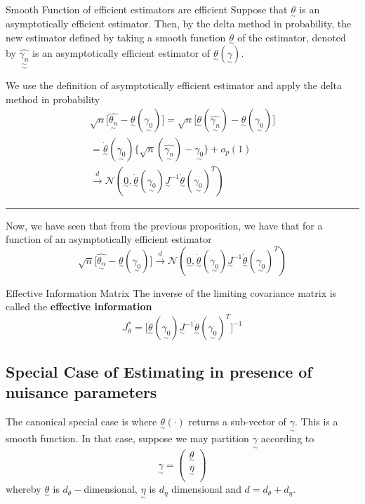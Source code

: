 \documentclass[twoside]{article}
\newenvironment{proof}{{\bf Proof:}}{\hfill\rule{2mm}{2mm}}
\newcommand{\utilde}{\underset{\sim}}
\begin{document}
\begin{proposition_exam}{Smooth Function of efficient estimators are efficient}{}
Suppose that $\utilde{\theta}$ is an asymptotically efficient estimator. Then, by the delta method in probability, the new estimator defined by taking a smooth function $\utilde{\theta}$ of the estimator, denoted by $\utilde{\utilde{\hat{\gamma_{n}}}}$ is an asymptotically efficient estimator of $\utilde{\theta}(\utilde{\gamma})$.
\end{proposition_exam}
\begin{proof} We use the definition of asymptotically efficient estimator and apply the delta method in probability
\begin{align}
\sqrt{n}\big[\hat{\utilde{\theta_{n}}} - \utilde{\theta}(\utilde{\gamma_{0}}) \big] = \sqrt{n}\big[\utilde{\theta}(\hat{\utilde{\gamma_{n}}}) - \utilde{\theta}(\utilde{\gamma_{0}}) \big] \\= \dot{\utilde{\theta}}(\utilde{\gamma_{0}})\bigg\{\sqrt{n}(\hat{\utilde{\gamma_{n}}}) - \utilde{\gamma_{0}} \bigg\} + o_p(1) \\ \xrightarrow{d} \mathcal{N}(\utilde{0}, \dot{\utilde{\theta}}(\utilde{\gamma_{0}})\utilde{J}^{-1}\dot{\utilde{\theta}}(\utilde{\gamma_{0}})^T)
\end{align}
\end{proof}

Now, we have seen that from the previous proposition, we have that for a function of an asymptotically efficient estimator
$$
\sqrt{n}\big[\hat{\utilde{\theta_{n}}} - \utilde{\theta}(\utilde{\gamma_{0}}) \big] \xrightarrow{d} \mathcal{N}(\utilde{0}, \dot{\utilde{\theta}}(\utilde{\gamma_{0}})\utilde{J}^{-1}\dot{\utilde{\theta}}(\utilde{\gamma_{0}})^T)
$$

\begin{definition_exam}{Effective Information Matrix}{} The inverse of the limiting covariance matrix is called the \textbf{effective information}
\begin{equation}
    J_{\theta}^{*} = \bigg[\dot{\utilde{\theta}}(\utilde{\gamma_{0}})\utilde{J}^{-1}\dot{\utilde{\theta}}(\utilde{\gamma_{0}})^T \bigg]^{-1}
\end{equation}
\end{definition_exam}

\subsection{Special Case of Estimating in presence of nuisance parameters}
The canonical special case is where $\utilde{\theta}(\cdot)$ returns a sub-vector of $\utilde{\gamma}.$ This is a smooth function. In that case, suppose we may partition $\utilde{\gamma}$ according to 
$$
\utilde{\gamma} = 
\begin{pmatrix}
    \utilde{\theta}\\
    \utilde{\eta}\\
\end{pmatrix}
$$
whereby $\utilde{\theta}$ is $d_{\theta}-$dimensional, $\utilde{\eta}$ is $d_{\eta}$ dimensional and $d = d_{\theta} + d_{\eta}.$
\end{document}
